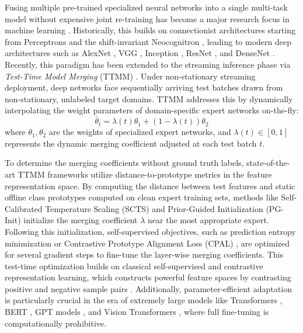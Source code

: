 \documentclass{article}
\theoremstyle{plain}
\theoremstyle{definition}
\theoremstyle{remark}
\begin{document}
Fusing multiple pre-trained specialized neural networks into a single multi-task model without expensive joint re-training has become a major research focus in machine learning \cite{wortsman22soups,ilharco22taskvectors,yadav23ties}. Historically, this builds on connectionist architectures starting from Perceptrons \cite{rosenblatt58perceptron} and the shift-invariant Neocognitron \cite{fukushima80neocognitron}, leading to modern deep architectures such as AlexNet \cite{krizhevsky12imagenet}, VGG \cite{simonyan14vgg}, Inception \cite{szegedy15inception}, ResNet \cite{he16resnet}, and DenseNet \cite{huang17densenet}. Recently, this paradigm has been extended to the streaming inference phase via \emph{Test-Time Model Merging} (TTMM) \cite{bertolissi2025local,clwfisher2026,ktfisher2026}. Under non-stationary streaming deployment, deep networks face sequentially arriving test batches drawn from non-stationary, unlabeled target domains. TTMM addresses this by dynamically interpolating the weight parameters of domain-specific expert networks on-the-fly:
\begin{equation}
\bar{\theta}_t = \lambda(t)\theta_1 + (1 - \lambda(t))\theta_2
\end{equation}
where $\theta_1, \theta_2$ are the weights of specialized expert networks, and $\lambda(t) \in [0, 1]$ represents the dynamic merging coefficient adjusted at each test batch $t$.

To determine the merging coefficients without ground truth labels, state-of-the-art TTMM frameworks utilize distance-to-prototype metrics in the feature representation space. By computing the distance between test features and static offline class prototypes computed on clean expert training sets, methods like Self-Calibrated Temperature Scaling (SCTS) and Prior-Guided Initialization (PG-Init) \cite{clwfisher2026} initialize the merging coefficient $\lambda$ near the most appropriate expert. Following this initialization, self-supervised objectives, such as prediction entropy minimization \cite{wang20tent} or Contrastive Prototype Alignment Loss (CPAL) \cite{clwfisher2026}, are optimized for several gradient steps to fine-tune the layer-wise merging coefficients. This test-time optimization builds on classical self-supervised and contrastive representation learning, which constructs powerful feature spaces by contrasting positive and negative sample pairs \cite{he20simclr,he20moco,caron20swav,grill20byol,caron21dino,oquab23dino2,he22mae}. Additionally, parameter-efficient adaptation is particularly crucial in the era of extremely large models like Transformers \cite{vaswani17transformer}, BERT \cite{devlin18bert}, GPT models \cite{radford19gpt2,brown20gpt3}, and Vision Transformers \cite{dosovitskiy20vit,touvron21deit,liu21swin}, where full fine-tuning is computationally prohibitive.
\end{document}
